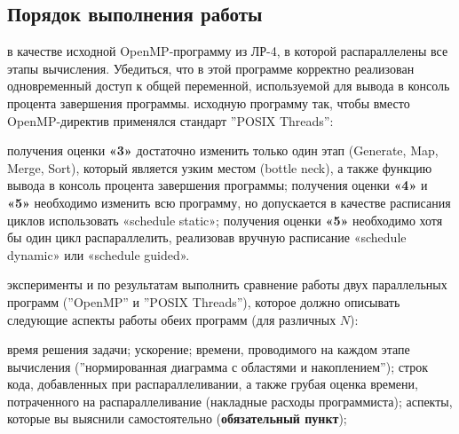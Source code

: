\subsection{Порядок выполнения работы}
\begin{enumerate}
     в качестве исходной OpenMP-программу из ЛР-4, в которой распараллелены все этапы вычисления. Убедиться, что в этой программе корректно реализован одновременный доступ к общей переменной, используемой для вывода в консоль процента завершения программы.
     исходную программу так, чтобы вместо OpenMP-ди\-рек\-тив применялся стандарт ''POSIX Threads'':
        \begin{itemize}
             получения оценки \textbf{«3»} достаточно изменить только один этап (Generate, Map, Merge, Sort), который является узким местом (bottle neck), а также функцию вывода в консоль процента завершения программы;
             получения оценки \textbf{«4»} и \textbf{«5»} необходимо изменить всю программу, но допускается в качестве расписания циклов использовать «schedule static»;
             получения оценки \textbf{«5»} необходимо хотя бы один цикл распараллелить, реализовав вручную расписание «schedule dynamic» или «schedule guided».
        \end{itemize}
     эксперименты и по результатам выполнить сравнение работы двух параллельных программ (''OpenMP'' и ''POSIX Thre\-ads''), которое должно описывать следующие аспекты работы обеих программ (для различных $N$):
        \begin{itemize}
             время решения задачи;
             ускорение;
             времени, проводимого на каждом этапе вычисления (''нормированная
диаграмма с областями и накоплением'');
             строк кода, добавленных при распараллеливании, а также грубая оценка
времени, потраченного на распараллеливание (накладные расходы программиста);
             аспекты, которые вы выяснили самостоятельно (\textbf{обязательный пункт});
        \end{itemize}
\end{enumerate}
